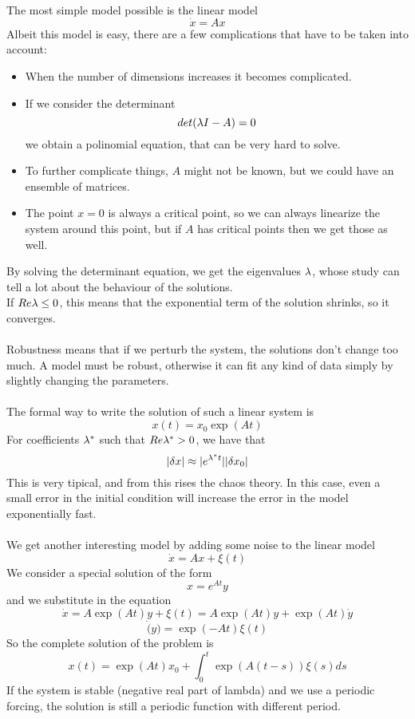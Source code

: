 The most simple model possible is the linear model
$$
	\dot{x} = Ax
$$
Albeit this model is easy, there are a few complications that have to be taken into account:
\begin{itemize}
	\item When the number of dimensions increases it becomes complicated. 
	\item If we consider the determinant
$$
	det(\lambda I - A) = 0
$$
we obtain a polinomial equation, that can be very hard to solve. 
	\item To further complicate things, $A$ might not be known, but we could have an ensemble of matrices. 
	\item The point $x=0$ is always a critical point, so we can always linearize the system around this point, but if $A$ has critical points then we get those as well. 
\end{itemize}
By solving the determinant equation, we get the eigenvalues $\lambda$, whose study can tell a lot about the behaviour of the solutions. \\
If $Re \lambda \leq 0$, this means that the exponential term of the solution shrinks, so it converges. \\ \\
Robustness means that if we perturb the system, the solutions don't change too much. A model must be robust, otherwise it can fit any kind of data simply by slightly changing the parameters. \\ \\
The formal way to write the solution of such a linear system is
$$
	x(t) = x_0\exp(At)
$$
For coefficients $\lambda^*$ such that $Re\lambda^* > 0$, we have that
$$
	|\delta x| \approx |e^{\lambda^* t}||\delta x_0|
$$
This is very tipical, and from this rises the chaos theory. In this case, even a small error in the initial condition will increase the error in the model exponentially fast. \\ \\
We get another interesting model by adding some noise to the linear model
$$
	\dot{x} = Ax + \xi(t)
$$
We consider a special solution of the form
$$
	x = e^{At}y
$$		
and we substitute in the equation
$$
	\dot{x} = A\exp(At)y + \xi(t) = A\exp(At)y + \exp(At)\dot{y}
$$	
$$
	\dot(y) = \exp(-At)\xi(t)
$$
So the complete solution of the problem is
$$
	x(t) = \exp(At)x_0 + \int_0^t \exp(A(t-s))\xi(s)ds
$$
If the system is stable (negative real part of lambda) and we use a periodic forcing, the solution is still a periodic function with different period. \\ \\
